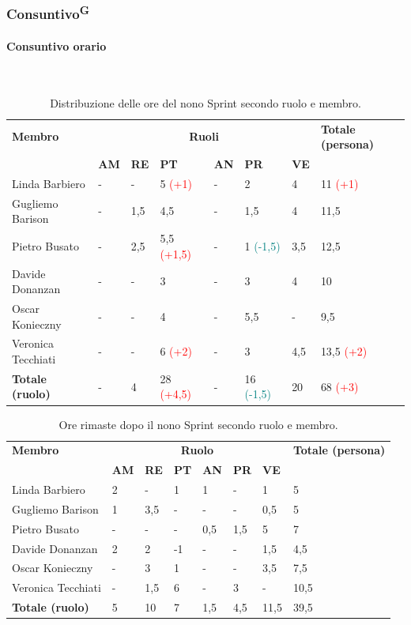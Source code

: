 \documentclass[8pt]{article}
\newcommand{\glossterm}[1]{#1\textsuperscript{G}} %
\newcommand{\subsubsubsection}[1]{\paragraph{#1}\mbox{}\\}
\begin{document}
\subsubsection{\glossterm{Consuntivo}}
\subsubsubsection{Consuntivo orario}
\begin{table}[ht!]
	\centering
	\begin{tabular}{p{4cm} *{6}{l} p{3cm}}
		\toprule
		\textbf{Membro} & \multicolumn{6}{c}{\textbf{Ruoli}} & \textbf{Totale
        (persona)}\\
		& \textbf{AM} & \textbf{RE} & \textbf{PT} & \textbf{AN} & \textbf{PR} & \textbf{VE}\\
		\midrule
        Linda Barbiero & - & - & 5 \textcolor{red}{(+1)} & - & 2 & 4 & 11 \textcolor{red}{(+1)} \\ 
        Gugliemo Barison & - & 1,5 & 4,5 & - & 1,5 & 4 & 11,5 \\ 
        Pietro Busato & - & 2,5 & 5,5 \textcolor{red}{(+1,5)} & - & 1 \textcolor{teal}{(-1,5)} & 3,5 & 12,5 \\ 
        Davide Donanzan & - & - & 3 & - & 3 & 4 & 10 \\ 
        Oscar Konieczny & - & - & 4 & - & 5,5 & - & 9,5 \\ 
        Veronica Tecchiati & - & - & 6 \textcolor{red}{(+2)} & - & 3 & 4,5 & 13,5 \textcolor{red}{(+2)} \\ 
        \midrule
        \textbf{Totale (ruolo)} & - & 4 & 28 \textcolor{red}{(+4,5)} & - & 16 \textcolor{teal}{(-1,5)} & 20 & 68 \textcolor{red}{(+3)} \\ 
		\bottomrule
	\end{tabular}
	\caption{Distribuzione delle ore del nono Sprint secondo ruolo e membro.}
	\label{table:Distribuzione delle ore del nono Sprint secondo ruolo e membro}
\end{table}
\begin{table}[ht!]
	\centering
	\begin{tabular}{p{4cm} p{1cm} p{1cm} p{1cm} p{1cm} p{1cm} p{1cm} p{3cm}}
		\toprule
        \textbf{Membro} & \multicolumn{6}{c}{\textbf{Ruolo}} & \textbf{Totale (persona)}\\
		& \textbf{AM} & \textbf{RE} & \textbf{PT} & \textbf{AN} & \textbf{PR} & \textbf{VE}\\
		\midrule
        Linda Barbiero & 2 & - & 1 & 1 & - & 1 & 5 \\ 
        Gugliemo Barison & 1 & 3,5 & - & - & - & 0,5 & 5 \\ 
        Pietro Busato & - & - & - & 0,5 & 1,5 & 5 & 7 \\ 
        Davide Donanzan & 2 & 2 & -1 & - & - & 1,5 & 4,5 \\ 
        Oscar Konieczny & - & 3 & 1 & - & - & 3,5 & 7,5 \\ 
        Veronica Tecchiati & - & 1,5 & 6 & - & 3 & - & 10,5 \\ 
        \midrule
        \textbf{Totale (ruolo)} & 5 & 10 & 7 & 1,5 & 4,5 & 11,5 & 39,5 \\
        \bottomrule
	\end{tabular}
	\caption{Ore rimaste dopo il nono Sprint secondo ruolo e membro.}
	\label{table:Ore rimaste dopo il nono Sprint secondo ruolo e membro}
\end{table}
\end{document}
